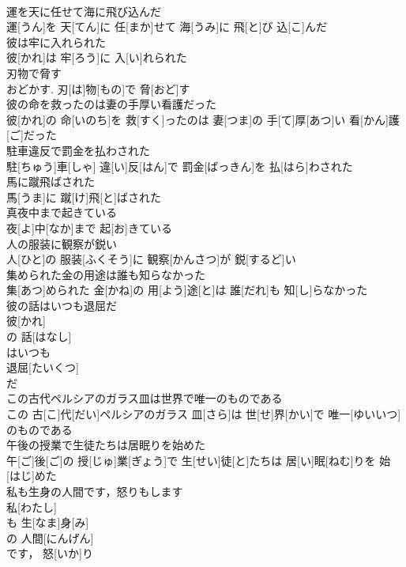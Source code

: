 \documentclass[8pt]{extreport}
\begin{document}
\begin{CJK}{UTF8}{min}
\\	運を天に任せて海に飛び込んだ	
\\	運[うん]を 天[てん]に 任[まか]せて 海[うみ]に 飛[と]び 込[こ]んだ
\\	彼は牢に入れられた	
\\	彼[かれ]は 牢[ろう]に 入[い]れられた
\\	刃物で脅す	
\\	おどかす.	刃[は]物[もの]で 脅[おど]す
\\	彼の命を救ったのは妻の手厚い看護だった	
\\	彼[かれ]の 命[いのち]を 救[すく]ったのは 妻[つま]の 手[て]厚[あつ]い 看[かん]護[ご]だった
\\	駐車違反で罰金を払わされた	
\\	駐[ちゅう]車[しゃ] 違[い]反[はん]で 罰金[ばっきん]を 払[はら]わされた
\\	馬に蹴飛ばされた	
\\	馬[うま]に 蹴[け]飛[と]ばされた
\\	真夜中まで起きている	
\\	[｟米国用法｠
\\	真[ま]夜[よ]中[なか]まで 起[お]きている
\\	人の服装に観察が鋭い	
\\	人[ひと]の 服装[ふくそう]に 観察[かんさつ]が 鋭[するど]い
\\	集められた金の用途は誰も知らなかった	
\\	集[あつ]められた 金[かね]の 用[よう]途[と]は 誰[だれ]も 知[し]らなかった
\\	彼の話はいつも退屈だ	
\\	彼[かれ]
\\	の 話[はなし]
\\	はいつも 
\\	退屈[たいくつ]
\\	だ
\\	この古代ペルシアのガラス皿は世界で唯一のものである	
\\	この 古[こ]代[だい]ペルシアのガラス 皿[さら]は 世[せ]界[かい]で 唯一[ゆいいつ]のものである
\\	午後の授業で生徒たちは居眠りを始めた	
\\	午[ご]後[ご]の 授[じゅ]業[ぎょう]で 生[せい]徒[と]たちは 居[い]眠[ねむ]りを 始[はじ]めた
\\	私も生身の人間です，怒りもします	
\\	私[わたし]
\\	も 生[なま]身[み]
\\	の 人間[にんげん]
\\	です， 怒[いか]り 

\end{CJK}
\end{document}
